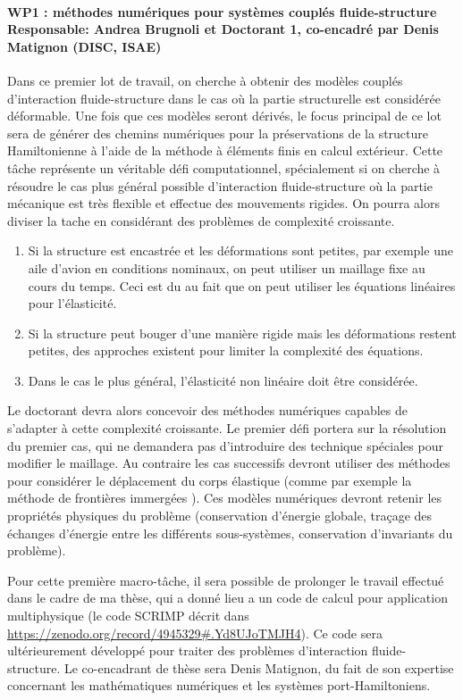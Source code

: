 \documentclass[12pt, french]{article}
\begin{document}
\paragraph{\large WP1 : méthodes numériques pour systèmes couplés fluide-structure\\
Responsable: Andrea Brugnoli et Doctorant 1, co-encadré par Denis Matignon (DISC, ISAE)\\}
 Dans ce premier lot de travail, on cherche à obtenir des modèles couplés d'interaction fluide-structure dans le cas où la partie structurelle est considérée déformable. Une fois que ces modèles seront dérivés, le focus principal de ce lot sera de générer des chemins numériques pour la préservations de la structure Hamiltonienne à l'aide de la méthode à éléments finis en calcul extérieur. Cette t\^ache représente un véritable défi computationnel, spécialement si on cherche à résoudre le cas plus général possible d'interaction fluide-structure où la partie mécanique est très flexible et effectue des mouvements rigides. On pourra alors diviser la tache en considérant des problèmes de complexité croissante. 
\begin{enumerate}
	\item Si la structure est encastrée et les déformations sont petites, par exemple une aile d'avion en conditions nominaux, on peut utiliser un maillage fixe au cours du temps. Ceci est du au fait que on peut utiliser les équations linéaires pour l'élasticité. 
	\item Si la structure peut bouger d'une manière rigide mais les déformations restent petites, des approches existent pour limiter la complexité des équations.
	\item Dans le cas le plus général, l'élasticité non linéaire doit être considérée.
\end{enumerate}
Le doctorant devra alors concevoir des méthodes numériques capables de s'adapter à cette complexité croissante. Le premier défi portera sur la résolution du premier cas, qui ne demandera pas d'introduire des technique spéciales pour modifier le maillage. Au contraire les cas successifs devront utiliser des méthodes pour considérer le déplacement du corps élastique (comme par exemple la méthode de frontières immergées \cite{peskin2002}). Ces modèles numériques devront retenir les propriétés physiques du problème (conservation d'énergie globale, traçage des échanges d'énergie entre les différents sous-systèmes, conservation d'invariants du problème).

Pour cette première macro-tâche, il sera possible de prolonger le travail effectué dans le cadre de ma thèse, qui a donn\'e lieu a un code de calcul pour application multiphysique (le code SCRIMP décrit dans \url{https://zenodo.org/record/4945329#.Yd8UJoTMJH4}). Ce code sera ultérieurement développé pour traiter des problèmes d'interaction fluide-structure. Le co-encadrant de thèse sera Denis Matignon, du fait de son expertise concernant les mathématiques numériques et les systèmes port-Hamiltoniens.
\end{document}

